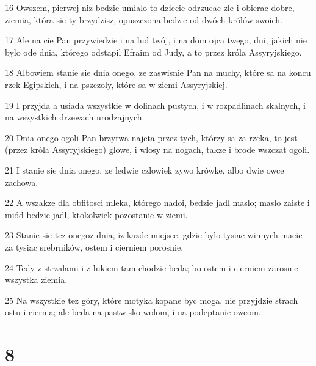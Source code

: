 \par 16 Owszem, pierwej niz bedzie umialo to dziecie odrzucac zle i obierac dobre, ziemia, która sie ty brzydzisz, opuszczona bedzie od dwóch królów swoich.
\par 17 Ale na cie Pan przywiedzie i na lud twój, i na dom ojca twego, dni, jakich nie bylo ode dnia, którego odstapil Efraim od Judy, a to przez króla Assyryjskiego.
\par 18 Albowiem stanie sie dnia onego, ze zaswisnie Pan na muchy, które sa na koncu rzek Egipskich, i na pszczoly, które sa w ziemi Assyryjskiej.
\par 19 I przyjda a usiada wszystkie w dolinach pustych, i w rozpadlinach skalnych, i na wszystkich drzewach urodzajnych.
\par 20 Dnia onego ogoli Pan brzytwa najeta przez tych, którzy sa za rzeka, to jest (przez króla Assyryjskiego) glowe, i wlosy na nogach, takze i brode wszczat ogoli.
\par 21 I stanie sie dnia onego, ze ledwie czlowiek zywo krówke, albo dwie owce zachowa.
\par 22 A wszakze dla obfitosci mleka, którego nadoi, bedzie jadl maslo; maslo zaiste i miód bedzie jadl, ktokolwiek pozostanie w ziemi.
\par 23 Stanie sie tez onegoz dnia, iz kazde miejsce, gdzie bylo tysiac winnych macic za tysiac srebrników, ostem i cierniem porosnie.
\par 24 Tedy z strzalami i z lukiem tam chodzic beda; bo ostem i cierniem zarosnie wszystka ziemia.
\par 25 Na wszystkie tez góry, które motyka kopane byc moga, nie przyjdzie strach ostu i ciernia; ale beda na pastwisko wolom, i na podeptanie owcom.

\chapter{8}

